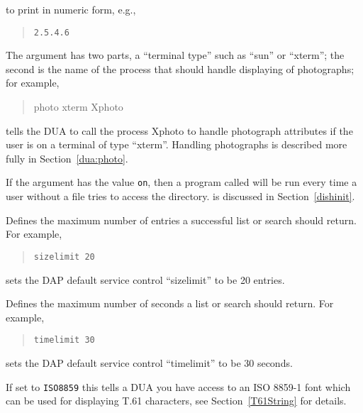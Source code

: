 \begin{describe}
to print in numeric form, e.g.,
\begin{quote}\small\begin{verbatim}
2.5.4.6
\end{verbatim}\end{quote}

\item [\verb"photo":]
The argument has two parts, a ``terminal type'' such as
``sun'' or ``xterm''; the second is the name of the process that should
handle displaying of photographs; for example,
\begin{quote}
photo xterm Xphoto
\end{quote}
tells the DUA to call the process Xphoto to handle photograph attributes if
the user is on a terminal of type ``xterm''.
Handling photographs is described more fully in Section~\ref{dua:photo}.

\item [\verb"quipurc":]
If the argument has the value \verb"on", then a program called 
 will be run every time a user without a 
file tries to access the directory.  is discussed 
in Section~\ref{dishinit}.

\item [\verb"sizelimit":]
Defines the maximum number of entries a successful list or search should
return.
For example,
\begin{quote}\small\begin{verbatim}
sizelimit 20
\end{verbatim}\end{quote}
sets the DAP default service control ``sizelimit'' to be 20 entries.

\item [\verb"timelimit":]
Defines the maximum number of seconds a list or search should
return.
For example,
\begin{quote}\small\begin{verbatim}
timelimit 30
\end{verbatim}\end{quote}
sets the DAP default service control ``timelimit'' to be 30 seconds.

\item [\verb"ch\_set":]
If set to \verb+ISO8859+ this tells a DUA you have access to an ISO
8859-1 font which can be used for displaying T.61 characters, see
Section~\ref{T61String} for details.

\end{describe}

